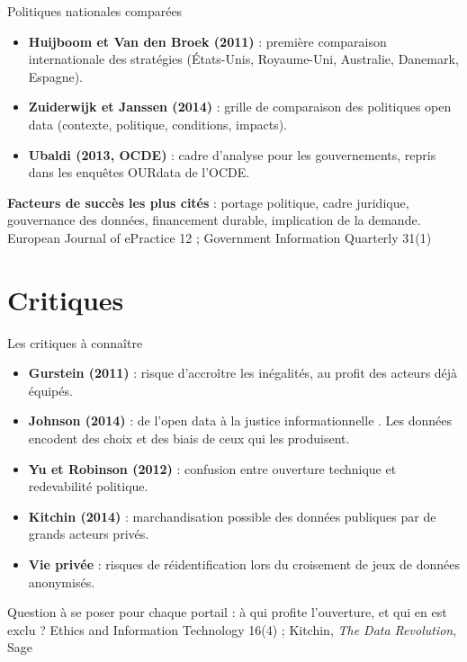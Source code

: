 \documentclass[11pt,aspectratio=169]{beamer}
\newcommand{\refc}[1]{\textcolor{gris}{\footnotesize #1}}
\begin{document}
\begin{frame}{Politiques nationales comparées}
  \begin{itemize}
    \item \textbf{Huijboom et Van den Broek (2011)} : première comparaison internationale des stratégies (États-Unis, Royaume-Uni, Australie, Danemark, Espagne).
    \item \textbf{Zuiderwijk et Janssen (2014)} : grille de comparaison des politiques open data (contexte, politique, conditions, impacts).
    \item \textbf{Ubaldi (2013, OCDE)} : cadre d'analyse pour les gouvernements, repris dans les enquêtes OURdata de l'OCDE.
  \end{itemize}
  \vspace{0.6em}
  \textbf{Facteurs de succès les plus cités} : portage politique, cadre juridique, gouvernance des données, financement durable, implication de la demande.
  \vfill
  \refc{European Journal of ePractice 12 ; Government Information Quarterly 31(1)}
\end{frame}

\section{Critiques}

\begin{frame}{Les critiques à connaître}
  \begin{itemize}
    \item \textbf{Gurstein (2011)} : risque d'accroître les inégalités, au profit des acteurs déjà équipés.
    \item \textbf{Johnson (2014)} : de l'open data à la \og justice informationnelle \fg{}. Les données encodent des choix et des biais de ceux qui les produisent.
    \item \textbf{Yu et Robinson (2012)} : confusion entre ouverture technique et redevabilité politique.
    \item \textbf{Kitchin (2014)} : marchandisation possible des données publiques par de grands acteurs privés.
    \item \textbf{Vie privée} : risques de réidentification lors du croisement de jeux de données anonymisés.
  \end{itemize}
  \vspace{0.5em}
  \alert{Question à se poser pour chaque portail} : à qui profite l'ouverture, et qui en est exclu ?
  \vfill
  \refc{Ethics and Information Technology 16(4) ; Kitchin, \emph{The Data Revolution}, Sage}
\end{frame}
\end{document}
